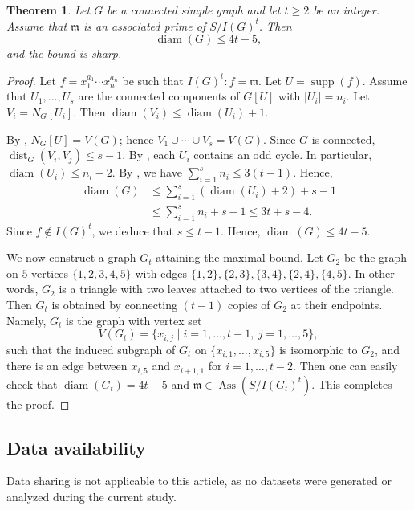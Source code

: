 \documentclass[12pt,reqno,twoside]{amsart}
\newcommand{\mm}{\mathfrak m}
\DeclareMathOperator{\diam}{diam}
\DeclareMathOperator{\Ass}{Ass}
\DeclareMathOperator{\dist}{dist}
\DeclareMathOperator{\supp}{supp}
\newtheorem{thm}{\bf Theorem}[section]
\theoremstyle{definition}
\theoremstyle{plain}
\theoremstyle{remark}
\numberwithin{equation}{section}
\begin{document}
\begin{thm}
Let $G$ be a connected simple graph and let $t \ge 2$ be an integer. Assume that $\mm$ is an associated prime of $S/I(G)^t$. Then
\[
\diam(G) \le 4t - 5,
\]
and the bound is sharp.
\end{thm}

\begin{proof}
Let $f = x_1^{a_1} \cdots x_n^{a_n}$ be such that $I(G)^t : f = \mm$. Let $U = \supp(f)$. Assume that $U_1, \ldots, U_s$ are the connected components of $G[U]$ with $|U_i| = n_i$. Let $V_i = N_G[U_i]$. Then $\diam(V_i) \le \diam(U_i) + 1$. 

By \cite[Corollary 2.2]{HLT}, $N_G[U] = V(G)$; hence $V_1 \cup \cdots \cup V_s = V(G)$. Since $G$ is connected, $\dist_G(V_i, V_j) \le s - 1$. By \cite[Lemma 2.8 and Lemma 2.9]{HLT}, each $U_i$ contains an odd cycle. In particular, $\diam(U_i) \le n_i - 2$. By \cite[Proposition 2.6]{HLT}, we have $\sum_{i=1}^s n_i \le 3(t - 1)$. Hence,
\begin{align*}
\diam(G) 
&\le \sum_{i=1}^s (\diam(U_i) + 2) + s - 1 \\
&\le \sum_{i=1}^s n_i + s - 1 \le 3t + s - 4.
\end{align*}
Since $f \notin I(G)^t$, we deduce that $s \le t - 1$. Hence, $\diam(G) \le 4t - 5$.

We now construct a graph $G_t$ attaining the maximal bound. Let $G_2$ be the graph on $5$ vertices $\{1,2,3,4,5\}$ with edges $\{1,2\}, \{2,3\}, \{3,4\}, \{2,4\}, \{4,5\}$. In other words, $G_2$ is a triangle with two leaves attached to two vertices of the triangle. Then $G_t$ is obtained by connecting $(t-1)$ copies of $G_2$ at their endpoints. Namely, $G_t$ is the graph with vertex set
\[
V(G_t) = \{x_{i,j} \mid i = 1, \ldots, t-1,\ j = 1, \ldots, 5\},
\]
such that the induced subgraph of $G_t$ on $\{x_{i,1}, \ldots, x_{i,5}\}$ is isomorphic to $G_2$, and there is an edge between $x_{i,5}$ and $x_{i+1,1}$ for $i = 1, \ldots, t - 2$. Then one can easily check that $\diam(G_t) = 4t - 5$ and $\mm \in \Ass(S/I(G_t)^{t})$. This completes the proof.
\end{proof}

\vspace{1mm}
\subsection*{Data availability}

Data sharing is not applicable to this article, as no datasets were generated or analyzed during the current study.
\end{document}
